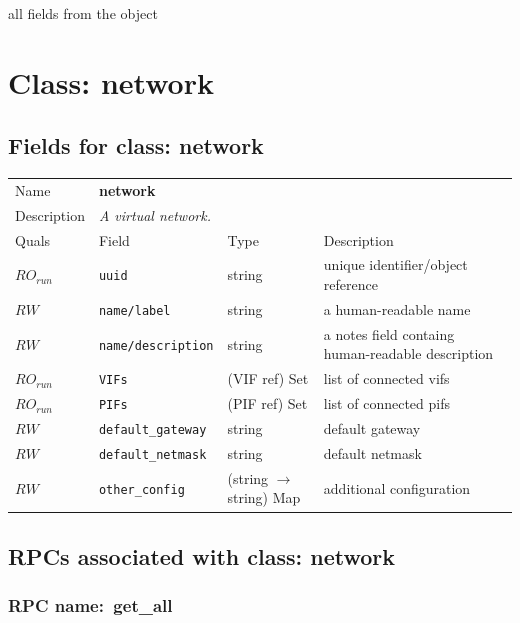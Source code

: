all fields from the object
\vspace{0.3cm}
\vspace{0.3cm}
\vspace{0.3cm}

\vspace{1cm}
\newpage
\section{Class: network}
\subsection{Fields for class: network}
\begin{longtable}{|lllp{}|}
\hline
\multicolumn{1}{|l}{Name} & \multicolumn{3}{l|}{\bf network} \\
\multicolumn{1}{|l}{Description} & \multicolumn{3}{l|}{\parbox{11cm}{\em A
virtual network.}} \\
\hline
Quals & Field & Type & Description \\
\hline
$\mathit{RO}_\mathit{run}$ &  {\tt uuid} & string & unique identifier/object reference \\
$\mathit{RW}$ &  {\tt name/label} & string & a human-readable name \\
$\mathit{RW}$ &  {\tt name/description} & string & a notes field containg human-readable description \\
$\mathit{RO}_\mathit{run}$ &  {\tt VIFs} & (VIF ref) Set & list of connected vifs \\
$\mathit{RO}_\mathit{run}$ &  {\tt PIFs} & (PIF ref) Set & list of connected pifs \\
$\mathit{RW}$ &  {\tt default\_gateway} & string & default gateway \\
$\mathit{RW}$ &  {\tt default\_netmask} & string & default netmask \\
$\mathit{RW}$ &  {\tt other\_config} & (string $\rightarrow$ string) Map & additional configuration \\
\hline
\end{longtable}
\subsection{RPCs associated with class: network}
\subsubsection{RPC name:~get\_all}

